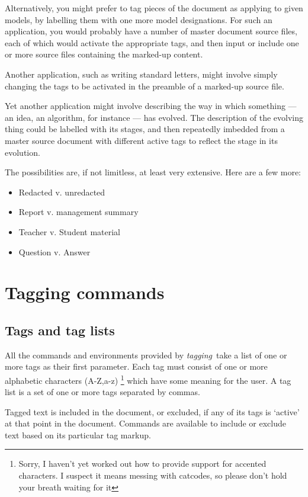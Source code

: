 \documentclass[a4paper,12pt,twoside,openany]{memoir}
\newcommand{\tpn}{tagging}
\newcommand{\tpname}{\textsf{\itshape \tpn}}
\begin{document}
Alternatively, you might prefer to tag pieces of the document
as applying to given models, by labelling them with one more
model designations. 
For such an application, you would probably have
a number of master document source files,
each of which would activate the appropriate tags,
and then input or include one or more source files
containing the marked-up content.

Another application, such as writing standard letters,
might involve simply changing the tags to be activated
in the preamble of a marked-up source file.

Yet another application might involve describing the way
in which something --- an idea, an algorithm, for instance --- has evolved.
The description of the evolving thing could be labelled with its stages,
and then repeatedly imbedded from a master source document with different
active tags to reflect the stage in its evolution. 

The possibilities are, if not limitless,
at least very extensive.
Here are a few more:
\begin{itemize}
\item Redacted v. unredacted
\item Report v. management summary
\item Teacher v. Student material
\item Question v. Answer
\end{itemize}
\chapter{Tagging commands}
\section{Tags and tag lists}
All the commands and environments provided by \tpname\
take a list of one or more tags as their first parameter.
Each tag must consist of one or more
alphabetic characters
(A-Z,a-z)%
\footnote{%
    Sorry, I haven't yet worked out
    how to provide support for accented characters.
    I suspect it means messing with catcodes,
    so please don't hold your breath waiting for it
}
which have some meaning for the user.
A tag list is a set of one or more tags separated by commas.

Tagged text is included in the document, or excluded,
if any of its tags is `active' at that point in the document.
Commands are available to include or exclude text based on its
particular tag markup.
\end{document}
